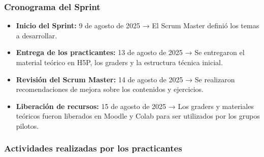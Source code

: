 \documentclass[letter,oneside,12pt,spanish]{report}
\begin{document}
\subsubsection*{Cronograma del Sprint}
\begin{itemize}
	\item \textbf{Inicio del Sprint:} 9 de agosto de 2025 → El Scrum Master definió los temas a desarrollar.
	\item \textbf{Entrega de los practicantes:} 13 de agosto de 2025 → Se entregaron el material teórico en H5P, los graders y la estructura técnica inicial.
	\item \textbf{Revisión del Scrum Master:} 14 de agosto de 2025 → Se realizaron recomendaciones de mejora sobre los contenidos y ejercicios.
	\item \textbf{Liberación de recursos:} 15 de agosto de 2025 → Los graders y materiales teóricos fueron liberados en Moodle y Colab para ser utilizados por los grupos pilotos.
\end{itemize}

\subsubsection*{Actividades realizadas por los practicantes}
\end{document}
